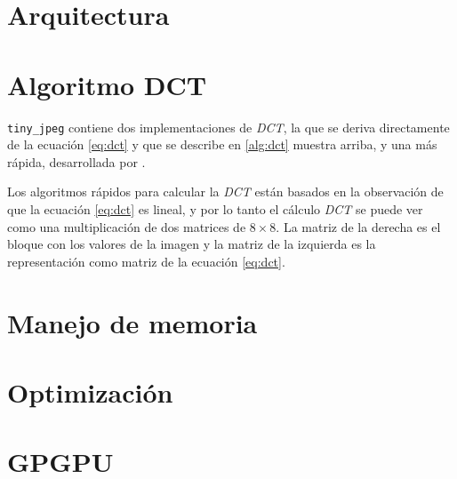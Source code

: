\section{Arquitectura}

\section{Algoritmo DCT}


\verb+tiny_jpeg+ contiene dos implementaciones de \emph{DCT}, la que se deriva directamente de la ecuación \ref{eq:dct} y que se describe en \ref{alg:dct}
muestra arriba, y una más rápida, desarrollada por \cite{ahmed_dct}.

Los algoritmos rápidos para calcular la \emph{DCT} están basados en la
observación de que la ecuación \ref{eq:dct} es lineal, y por lo tanto el
cálculo \emph{DCT} se puede ver como una multiplicación de dos matrices de
$8\times8$. La matriz de la derecha es el bloque con los valores de la imagen y
la matriz de la izquierda es la representación como matriz de la ecuación
\ref{eq:dct}.

\section{Manejo de memoria}

\section{Optimización}

\section{GPGPU}

